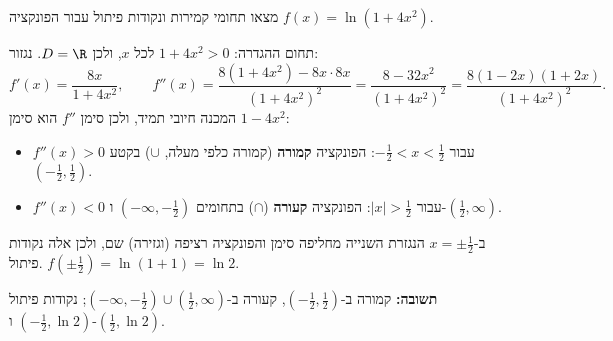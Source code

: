 
\begin{question}
מצאו תחומי קמירות ונקודות פיתול עבור הפונקציה $f(x)=\ln(1+4x^2)$.
\end{question}

\begin{solution}
תחום ההגדרה: $1+4x^2>0$ לכל $x$, ולכן $D=\R$. נגזור:
\[ f'(x)=\frac{8x}{1+4x^2},\qquad
f''(x)=\frac{8(1+4x^2)-8x\cdot 8x}{(1+4x^2)^2}=\frac{8-32x^2}{(1+4x^2)^2}=\frac{8(1-2x)(1+2x)}{(1+4x^2)^2}. \]
המכנה חיובי תמיד, ולכן סימן $f''$ הוא סימן $1-4x^2$:
\begin{itemize}
  \item $f''(x)>0$ עבור $-\frac12<x<\frac12$: הפונקציה \textbf{קמורה} (קמורה כלפי מעלה, $\cup$) בקטע $\left(-\frac12,\frac12\right)$.
  \item $f''(x)<0$ עבור $|x|>\frac12$: הפונקציה \textbf{קעורה} ($\cap$) בתחומים $\left(-\infty,-\frac12\right)$ ו-$\left(\frac12,\infty\right)$.
\end{itemize}
ב-$x=\pm\frac12$ הנגזרת השנייה מחליפה סימן והפונקציה רציפה (וגזירה) שם, ולכן אלה נקודות פיתול. $f(\pm\tfrac12)=\ln(1+1)=\ln 2$.

\textbf{תשובה:} קמורה ב-$\left(-\frac12,\frac12\right)$, קעורה ב-$\left(-\infty,-\frac12\right)\cup\left(\frac12,\infty\right)$; נקודות פיתול $\left(-\frac12,\ln 2\right)$ ו-$\left(\frac12,\ln 2\right)$.
\end{solution}
